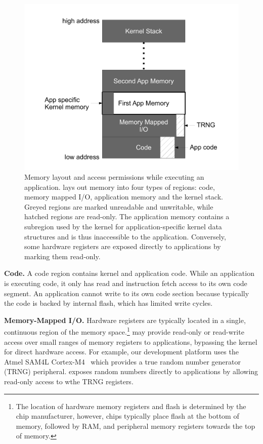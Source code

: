 \begin{figure}
 \centering
\includegraphics[width=1\columnwidth]{img/memory-layout}
\caption{Memory layout and access permissions while executing an application.
\name lays out memory into four types of regions: code, memory mapped I/O,
application memory and the kernel stack. Greyed regions are marked unreadable
and unwritable, while hatched regions are read-only. The application memory
contains a subregion used by the kernel for application-specific kernel data
structures and is thus inaccessible to the application. Conversely, some
hardware registers are exposed directly to applications by marking them
read-only.}
 \label{fig:memory-layout}
\end{figure}



{\bf Code.}
A code region contains kernel and application code. While an application is
executing code, it only has read and instruction fetch access to its own code
segment. An application cannot write to its own code section because typically
the code is backed by internal flash, which has limited write cycles.

{\bf Memory-Mapped I/O.}
Hardware registers are typically located in a single, continuous region of the
memory space.\footnote{The location of hardware memory registers and flash is
determined by the chip manufacturer, however, chips typically place flash at
the bottom of memory, followed by RAM, and peripheral memory registers towards
the top of memory.} \name may provide read-only or read-write access over small
ranges of memory registers to applications, bypassing the kernel for direct
hardware access. For example, our development platform uses the Atmel SAM4L
Cortex-M4~\cite{sam4l} which provides a true random number generator (TRNG)
peripheral. \name exposes random numbers directly to applications by allowing
read-only access to wthe TRNG registers.

